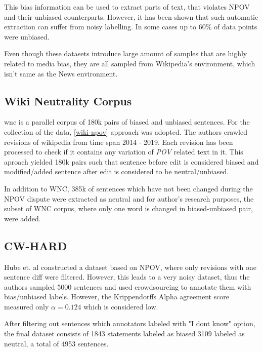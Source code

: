 This bias information can be used to extract parts of text, that violates NPOV and their unbiased counterparts. However, it has been shown \cite{hube2019neural,zhong-etal-2021-wikibias-detecting} that such automatic extraction can suffer from noisy labelling. In some cases \cite{hube2019neural} up to 60\% of data points were unbiased.

Even though these datasets introduce large amount of samples that are highly related to media bias, they are all sampled from Wikipedia's environment, which isn't same as the News environment. 




\subsection{Wiki Neutrality Corpus}\label{wiki}
\Gls{wnc} \cite{pryzant2020automatically} is a parallel corpus of 180k pairs of biased and unbiased sentences. For the collection of the data, \ref{wiki-npov} approach was adopted. The authors crawled revisions of wikipedia from time span 2014 - 2019. Each revision has been processed to check if it contains any variation of \textit{POV} related text in it. This aproach yielded 180k pairs such that sentence before edit is considered biased and modified/added sentence after edit is considered to be neutral/unbiased.
    
In addition to WNC, 385k of sentences which have not been changed during the NPOV dispute were extracted as neutral and for author's research purposes, the subset of WNC corpus, where only one word is changed in biased-unbiased pair, were added.




\subsection{CW-HARD}
Hube et. al \cite{hube2019neural} constructed a dataset based on NPOV, where only revisions with one sentence diff were filtered. However, this leads to a very noisy dataset, thus the authors sampled 5000 sentences and used crowdsourcing to annotate them with bias/unbiased labels. However, the Krippendorffs Alpha agreement score measured only $\alpha = 0.124$ which is considered low. 

After filtering out sentences which annotators labeled with "I dont know" option, the final dataset consists of 1843 statements labeled as biased 3109 labeled as neutral, a total of 4953 sentences.




